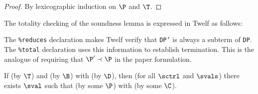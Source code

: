 
\begin{proof}
By lexicographic induction on $\P$ and $\T$.


\end{proof}

\Twelf
The totality checking of the soundness lemma is expressed in Twelf as follows:

The \texttt{\%reduces} declaration makes Twelf verify that \texttt{DP'} is always a subterm of \texttt{DP}.
The \texttt{\%total} declaration uses this information to establish termination.
This is the analogue of requiring that $\P' \prec \P$ in the paper formulation.


\begin{lemma}[Completeness]
\label{lem:completeness-bs}
If  (by $\T$) and \bev{\benv}{\bexp}{\bval} (by $\B$) with \cor{\benv}{\senv} (by $\D$), then (for all $\sctrl$ and $\svals$) there exists $\sval$ such that  (by some $\P$) with \cor{\bval}{\sval} (by some $\C$).
\end{lemma}


